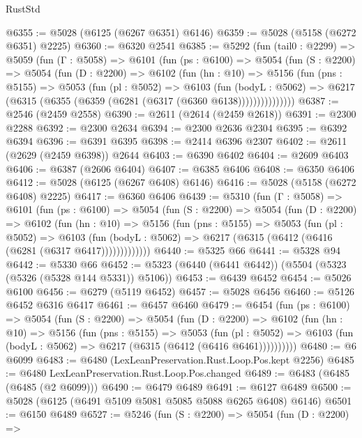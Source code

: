 \begin{lexlean}{RustStd}
\begin{coremodule}
{\begin{coremodule}
{{{{{{{{{{{{@6355 := @5028 (@6125 (@6267 @6351) @6146)
@6359 := @5028 (@5158 (@6272 @6351) @2225)
@6360 := @6320 @2541
@6385 := @5292
    (fun (tail0 : @2299) =>
    @5059
      (fun (Γ : @5058) =>
      @6101
        (fun (ps : @6100) =>
        @5054
          (fun (S : @2200) =>
          @5054
            (fun (D : @2200) =>
            @6102
              (fun (hn : @10) =>
              @5156
                (fun (pns : @5155) =>
                @5053
                  (fun (pl : @5052) =>
                  @6103
                    (fun (bodyL : @5062) =>
                    @6217 (@6315 (@6355 (@6359 (@6281 (@6317 (@6360 @6138)))))))))))))))
@6387 := @2546 (@2459 @2558)
@6390 := @2611 (@2614 (@2459 @2618))
@6391 := @2300 @2288
@6392 := @2300 @2634
@6394 := @2300 @2636 @2304
@6395 := @6392 @6394
@6396 := @6391 @6395
@6398 := @2414 @6396 @2307
@6402 := @2611 (@2629 (@2459 @6398)) @2644
@6403 := @6390 @6402
@6404 := @2609 @6403
@6406 := @6387 (@2606 @6404)
@6407 := @6385 @6406
@6408 := @6350 @6406
@6412 := @5028 (@6125 (@6267 @6408) @6146)
@6416 := @5028 (@5158 (@6272 @6408) @2225)
@6417 := @6360 @6406
@6439 := @5310
    (fun (Γ : @5058) =>
    @6101
      (fun (ps : @6100) =>
      @5054
        (fun (S : @2200) =>
        @5054
          (fun (D : @2200) =>
          @6102
            (fun (hn : @10) =>
            @5156
              (fun (pns : @5155) =>
              @5053
                (fun (pl : @5052) =>
                @6103
                  (fun (bodyL : @5062) =>
                  @6217 (@6315 (@6412 (@6416 (@6281 (@6317 @6417)))))))))))))
@6440 := @5325 @66
@6441 := @5328 @94
@6442 := @5330 @66
@6452 := @5323 (@6440 (@6441 @6442)) (@5504 (@5323 (@5326 (@5328 @144 @5331)) @5106))
@6453 := @6439 @6452
@6454 := @5026 @6100
@6456 := @6279 (@5119 @6452)
@6457 := @5028 @6456
@6460 := @5126 @6452 @6316 @6417
@6461 := @6457 @6460
@6479 := @6454
    (fun (ps : @6100) =>
    @5054
      (fun (S : @2200) =>
      @5054
        (fun (D : @2200) =>
        @6102
          (fun (hn : @10) =>
          @5156
            (fun (pns : @5155) =>
            @5053
              (fun (pl : @5052) =>
              @6103 (fun (bodyL : @5062) => @6217 (@6315 (@6412 (@6416 @6461))))))))))
@6480 := @6 @6099
@6483 := @6480 (LexLeanPreservation.Rust.Loop.Pos.kept @2256)
@6485 := @6480 LexLeanPreservation.Rust.Loop.Pos.changed
@6489 := @6483 (@6485 (@6485 (@2 @6099)))
@6490 := @6479 @6489
@6491 := @6127 @6489
@6500 := @5028 (@6125 (@6491 @5109 @5081 @5085 @5088 @6265 @6408) @6146)
@6501 := @6150 @6489
@6527 := @5246
    (fun (S : @2200) =>
    @5054
      (fun (D : @2200) =>
}}}}}}}}}}}}
\end{coremodule}}
\end{coremodule}
\end{lexlean}
